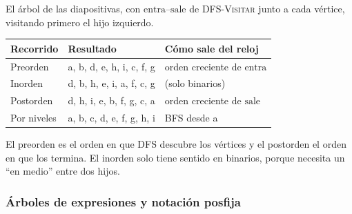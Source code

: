 \documentclass[11pt,letterpaper]{article}
\begin{document}
\begin{ejemplo}
  \label{ej:arbol-recorridos}
  El árbol de las diapositivas, con $\text{entra}$--$\text{sale}$ de
  \textsc{DFS-Visitar} junto a cada vértice, visitando primero el hijo
  izquierdo.
  \begin{center}
  \end{center}
  \begin{center}
  \small
  \begin{tabular}{lll}
    \toprule
    \textbf{Recorrido} & \textbf{Resultado}
      & \textbf{Cómo sale del reloj} \\
    \midrule
    Preorden & a, b, d, e, h, i, c, f, g
      & orden creciente de $\text{entra}$ \\
    Inorden & d, b, h, e, i, a, f, c, g & (solo binarios) \\
    Postorden & d, h, i, e, b, f, g, c, a
      & orden creciente de $\text{sale}$ \\
    Por niveles & a, b, c, d, e, f, g, h, i & BFS desde a \\
    \bottomrule
  \end{tabular}
  \end{center}
  El preorden es el orden en que DFS descubre los vértices y el
  postorden el orden en que los termina. El inorden solo tiene sentido
  en binarios, porque necesita un ``en medio'' entre dos hijos.
\end{ejemplo}

\subsubsection*{Árboles de expresiones y notación posfija}
\end{document}
